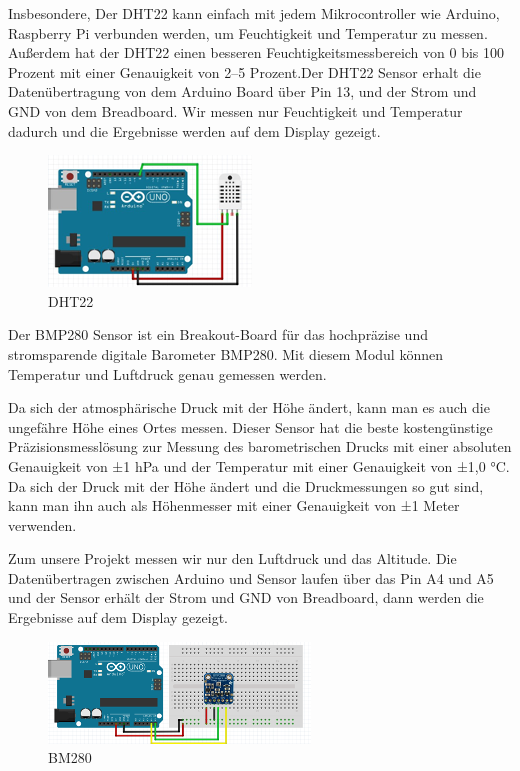 \documentclass[conference]{IEEEtran}
\begin{document}
Insbesondere, Der DHT22 kann einfach mit jedem Mikrocontroller wie Arduino, Raspberry Pi verbunden werden, um Feuchtigkeit und Temperatur zu messen. Außerdem hat der DHT22 einen besseren Feuchtigkeitsmessbereich von 0 bis 100 Prozent mit einer Genauigkeit von 2–5 Prozent.Der DHT22 Sensor erhalt die Datenübertragung von dem Arduino Board über Pin 13, und der Strom und GND von dem Breadboard.  Wir messen nur Feuchtigkeit und Temperatur dadurch und die Ergebnisse werden auf dem Display gezeigt. 


\begin{figure} [h]
	\centering
	\includegraphics[width=0.7\linewidth]{fig27}
	\caption{DHT22}
	\label{fig:fig27}
\end{figure}




Der  BMP280 Sensor ist ein Breakout-Board für das hochpräzise und stromsparende digitale Barometer BMP280. Mit diesem Modul können Temperatur und Luftdruck genau gemessen werden. 

Da sich der atmosphärische Druck mit der Höhe ändert, kann man es auch die ungefähre Höhe eines Ortes messen.
Dieser Sensor hat die beste kostengünstige Präzisionsmesslösung zur Messung des barometrischen Drucks mit einer absoluten Genauigkeit von ±1 hPa und der Temperatur mit einer Genauigkeit von ±1,0 °C. Da sich der Druck mit der Höhe ändert und die Druckmessungen so gut sind, kann man ihn auch als Höhenmesser mit einer Genauigkeit von ±1 Meter verwenden.

Zum unsere Projekt messen wir nur den Luftdruck und das Altitude. Die Datenübertragen zwischen Arduino und Sensor laufen über das Pin A4 und A5 und der Sensor erhält der Strom und GND von Breadboard, dann werden die Ergebnisse auf dem Display gezeigt. 

\begin{figure} [h]
	\centering
	\includegraphics[width=0.8\linewidth]{fig28}
	\caption{BM280}
	\label{fig:fig28}
\end{figure}
\end{document}
